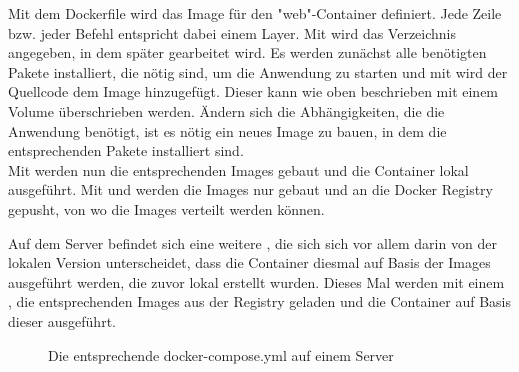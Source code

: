 \noindent Mit dem Dockerfile wird das Image für den "{}web"{}-Container definiert. Jede Zeile bzw. jeder Befehl entspricht dabei einem Layer. Mit  wird das Verzeichnis angegeben, in dem später gearbeitet wird. Es werden zunächst alle benötigten Pakete installiert, die nötig sind, um die Anwendung zu starten und mit  wird der Quellcode dem Image hinzugefügt. Dieser kann wie oben beschrieben mit einem Volume überschrieben werden. Ändern sich die Abhängigkeiten, die die Anwendung benötigt, ist es nötig ein neues Image zu bauen, in dem die entsprechenden Pakete installiert sind.\\

\noindent Mit  werden nun die entsprechenden Images gebaut und die Container lokal ausgeführt. Mit  und  werden die Images nur gebaut und an die Docker Registry gepusht, von wo die Images verteilt werden können.\\

\newpage

\noindent Auf dem Server befindet sich eine weitere , die sich sich vor allem darin von der lokalen Version unterscheidet, dass die Container diesmal auf Basis der Images ausgeführt werden, die zuvor lokal erstellt wurden. Dieses Mal werden mit einem , die entsprechenden Images aus der Registry geladen und die Container auf Basis dieser ausgeführt.

\begin{figure}[!ht]
  \centering
  \caption{Die entsprechende docker-compose.yml auf einem Server}\label{figure:docker-compose production}
\end{figure}
